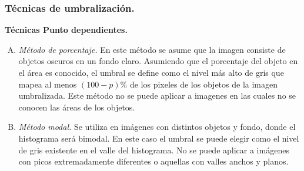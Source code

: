 \documentclass[12pt]{report}
\begin{document}
\subsubsection{Técnicas de umbralización.}\cite{umbral}
\textbf{ Técnicas Punto dependientes.}
\begin{enumerate}[A.]
\item \textit{Método de porcentaje.} En este método se asume que la imagen consiste de objetos oscuros en un fondo claro. Asumiendo que el porcentaje del objeto en el área es conocido, el umbral se define  como el nivel más alto de gris que mapea al menos $(100 - p)\%$ de los pixeles de los objetos de la imagen umbralizada. Este método no se puede aplicar a imagenes en las cuales no se conocen las áreas de los objetos.

\item \textit{Método modal.} Se utiliza en imágenes con distintos objetos y fondo, donde el histograma será bimodal. En este caso el umbral  se puede elegir como el nivel de gris existente en el valle del histograma. No se puede aplicar a imágenes con picos extremadamente diferentes o aquellas con valles anchos y planos.


\end{enumerate}
\end{document}
